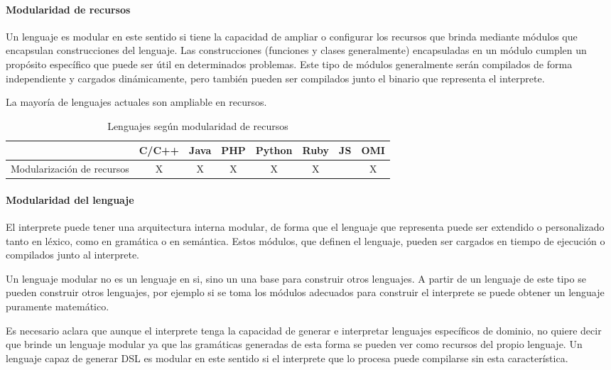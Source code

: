 \paragraph{Modularidad de recursos}
Un lenguaje es modular en este sentido si tiene la capacidad de ampliar o configurar los recursos que brinda mediante módulos 
que encapsulan construcciones del lenguaje. Las construcciones 
(funciones y clases generalmente) encapsuladas en un módulo cumplen un propósito específico
que puede ser útil en determinados problemas. Este tipo de módulos
generalmente serán compilados de forma independiente y cargados dinámicamente, pero 
también pueden ser compilados junto el binario que representa el interprete.

La mayoría de lenguajes actuales son ampliable en recursos. 

\FloatBarrier
\begin{table}[h]
\begin{center}
\begin{tabular}{|r|c|c|c|c|c|c|c|} \hline
 & C/C++ & Java & PHP  & Python & Ruby & JS & OMI\\ \hline
Modularización de recursos & X & X & X & X & X &   & X \\ \hline
\end{tabular}
\end{center}
\caption{Lenguajes según modularidad de recursos}
\end{table}
\FloatBarrier

\paragraph{Modularidad del lenguaje}
El interprete puede tener una arquitectura interna modular, de forma que el 
lenguaje que representa puede ser extendido o personalizado tanto 
en léxico, como en gramática o en semántica.  Estos módulos, que definen
el lenguaje, pueden ser cargados en tiempo de ejecución o compilados junto 
al interprete.

Un lenguaje modular no es un lenguaje en si, sino un una base para construir otros 
lenguajes. A partir de un lenguaje de este tipo se pueden construir otros lenguajes,
por ejemplo si se toma los módulos adecuados para construir el interprete
se puede obtener un lenguaje puramente matemático.

Es necesario aclara que aunque el interprete tenga la capacidad de generar e interpretar lenguajes
específicos de dominio, no quiere decir que brinde un lenguaje modular ya que las gramáticas
generadas de esta forma se pueden ver como recursos del propio lenguaje. Un lenguaje capaz de generar 
DSL es modular en este sentido si el interprete que lo procesa puede compilarse sin esta característica.

